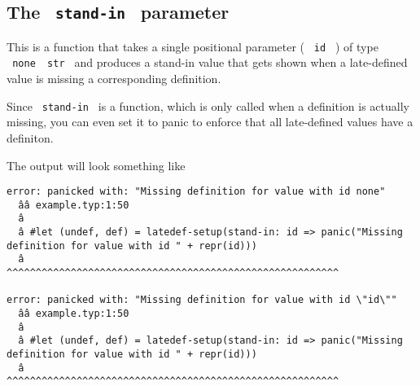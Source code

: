\subsection{\texorpdfstring{The \texttt{\ stand-in\ }
parameter}{The  stand-in  parameter}}\label{the-stand-in-parameter}

This is a function that takes a single positional parameter (
\texttt{\ id\ } ) of type \texttt{\ none\ \textbar{}\ str\ } and
produces a stand-in value that gets shown when a late-defined value is
missing a corresponding definition.

\begin{Shaded}
\begin{Highlighting}[]

\end{Highlighting}
\end{Shaded}


Since \texttt{\ stand-in\ } is a function, which is only called when a
definition is actually missing, you can even set it to panic to enforce
that all late-defined values have a definiton.

\begin{Shaded}
\begin{Highlighting}[]
\end{Highlighting}
\end{Shaded}

The output will look something like

\begin{verbatim}
error: panicked with: "Missing definition for value with id none"
  ââ example.typ:1:50
  â
  â #let (undef, def) = latedef-setup(stand-in: id => panic("Missing definition for value with id " + repr(id)))
  â                                                   ^^^^^^^^^^^^^^^^^^^^^^^^^^^^^^^^^^^^^^^^^^^^^^^^^^^^^^^^^

error: panicked with: "Missing definition for value with id \"id\""
  ââ example.typ:1:50
  â
  â #let (undef, def) = latedef-setup(stand-in: id => panic("Missing definition for value with id " + repr(id)))
  â                                                   ^^^^^^^^^^^^^^^^^^^^^^^^^^^^^^^^^^^^^^^^^^^^^^^^^^^^^^^^^
\end{verbatim}

